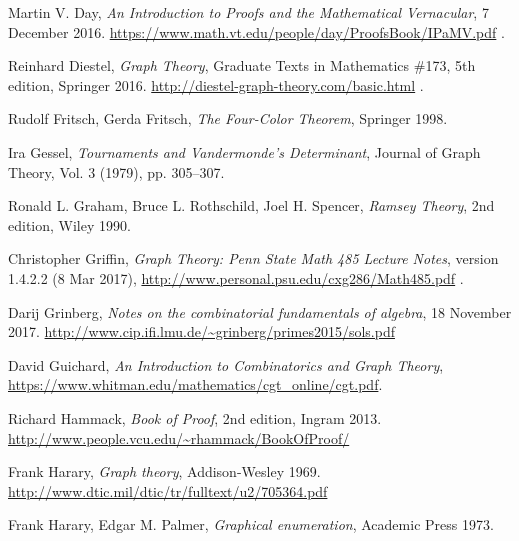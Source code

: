 \documentclass[numbers=enddot,12pt,final,onecolumn,notitlepage]{scrartcl}%
\theoremstyle{definition}
\begin{document}
\begin{thebibliography}{9999999999}
Martin V. Day,
\textit{An Introduction to Proofs and the Mathematical Vernacular},
7 December 2016.
\newline\url{https://www.math.vt.edu/people/day/ProofsBook/IPaMV.pdf} .


Reinhard Diestel, \textit{Graph Theory},
Graduate Texts in Mathematics \#173, 5th edition, Springer 2016.
\newline \url{http://diestel-graph-theory.com/basic.html} .

Rudolf Fritsch, Gerda Fritsch,
\textit{The Four-Color Theorem},
Springer 1998.

Ira Gessel, \textit{Tournaments and
Vandermonde's Determinant}, Journal of Graph Theory, Vol. 3 (1979), pp. 305--307.

Ronald L. Graham, Bruce L. Rothschild,
Joel H. Spencer, \textit{Ramsey Theory}, 2nd edition,
Wiley 1990.

Christopher Griffin,
\textit{Graph Theory: Penn State Math 485 Lecture Notes},
version 1.4.2.2 (8 Mar 2017),
\newline\url{http://www.personal.psu.edu/cxg286/Math485.pdf} .

Darij Grinberg, \textit{Notes on the combinatorial
fundamentals of algebra}, 18 November 2017.
\newline\url{http://www.cip.ifi.lmu.de/~grinberg/primes2015/sols.pdf}

David Guichard,
\textit{An Introduction to Combinatorics and Graph Theory},
\newline\url{https://www.whitman.edu/mathematics/cgt_online/cgt.pdf}.

Richard Hammack,
\textit{Book of Proof},
2nd edition, Ingram 2013.
\newline\url{http://www.people.vcu.edu/~rhammack/BookOfProof/}

Frank Harary,
\textit{Graph theory},
Addison-Wesley 1969.
\newline\url{http://www.dtic.mil/dtic/tr/fulltext/u2/705364.pdf}

Frank Harary, Edgar M. Palmer,
\textit{Graphical enumeration},
Academic Press 1973.


\end{thebibliography}
\end{document}
